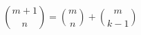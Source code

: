 \documentclass{book}
\begin{document}
\begin{equation*}
{{m+1 \choose n}}={{m \choose n}}+{{m
\choose k-1}}
\end{equation*}
\end{document}
